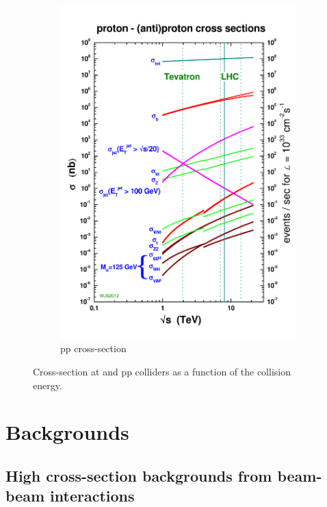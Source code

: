 \begin{figure}
\begin{subfigure}[b]{0.4\textwidth}
\includegraphics[width=\textwidth]{Figures/LHC_cross_section.pdf}
\caption{pp cross-section~\cite{LHC_cross}}
\end{subfigure}
\caption[Cross-sections for ILC and LHC]{Cross-section at \positron \electron and pp colliders as a function of the collision energy.}
\label{fig:Cross_sections}
\end{figure}

\section{Backgrounds}
\label{Backgrounds}
\subsection{High cross-section backgrounds from beam-beam interactions}
\label{BeamBeam}
